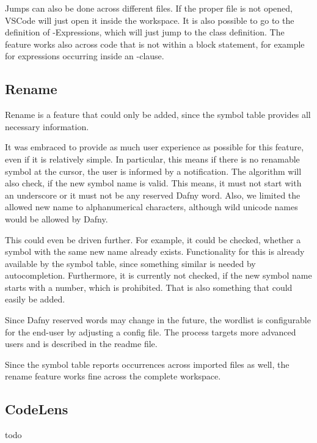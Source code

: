 Jumps can also be done across different files.
If the proper file is not opened, VSCode will just open it inside the workspace.
It is also possible to go to the definition of -Expressions, which will just jump to the class definition.
The feature works also across code that is not within a block statement, for example for expressions occurring inside an -clause.


\subsection{Rename}
Rename is a feature that could only be added, since the symbol table provides all necessary information.

It was embraced to provide as much user experience as possible for this feature, even if it is relatively simple.
In particular, this means if there is no renamable symbol at the cursor, the user is informed by a notification.
The algorithm will also check, if the new symbol name is valid.
This means, it must not start with an underscore or it must not be any reserved Dafny word.
Also, we limited the allowed new name to alphanumerical characters, although wild unicode names would be allowed by Dafny.

This could even be driven further.
For example, it could be checked, whether a symbol with the same new name already exists.
Functionality for this is already available by the symbol table, since something similar is needed by autocompletion.
Furthermore, it is currently not checked, if the new symbol name starts with a number, which is prohibited.
That is also something that could easily be added. 

Since Dafny reserved words may change in the future, the wordlist is configurable for the end-user by adjusting a config file.
The process targets more advanced users and is described in the readme file.

Since the symbol table reports occurrences across imported files as well, the rename feature works fine across the complete workspace.




\subsection{CodeLens}
todo

